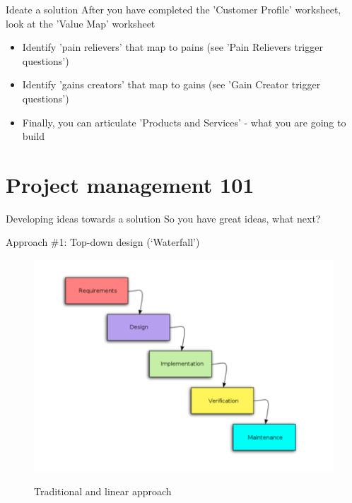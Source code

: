 \documentclass[aspectratio=43, 11pt]{beamer} %
\begin{document}
\begin{frame}{Ideate a solution}
    After you have completed the 'Customer Profile' worksheet, look at the 'Value Map' worksheet
    \begin{itemize}[label=\textbullet]
        \item Identify 'pain relievers' that map to pains (see 'Pain Relievers trigger questions')
        \item Identify 'gains creators' that map to gains (see 'Gain Creator trigger questions')
        \item Finally, you can articulate 'Products and Services' - what you are going to build 
    \end{itemize}
\end{frame}

\section{Project management 101}

\begin{frame}{Developing ideas towards a solution}
    So you have great ideas, what next? 
\end{frame}

\begin{frame}{Approach \#1: Top-down design (`Waterfall')}
 \begin{figure}[Waterfall]
    \centering
        \includegraphics[height=.75\textheight]{figures/waterfall.png}
        \caption{Traditional and linear approach} \cite{Parody2018-if}
        \label{fig:6}
 \end{figure}
\end{frame}
\end{document}
